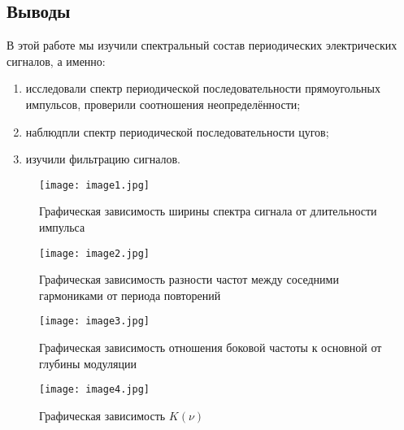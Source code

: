 \documentclass[a4paper,12pt]{article} %
\begin{document}
\subsection{Выводы}

В этой работе мы изучили спектральный состав периодических электрических сигналов, а именно:

\begin{enumerate}
    \item исследовали спектр периодической последовательности прямоугольных импульсов, проверили соотношения неопределённости;
    \item наблюдпли спектр периодической последовательности цугов;
    \item изучили фильтрацию сигналов.
\end{enumerate}


    \begin{figure}[h]
        \centering
        \texttt{[image: image1.jpg]}
        \caption{Графическая зависимость ширины спектра сигнала от длительности импульса}
        \label{graf1}
    \end{figure}
    \begin{figure}[h]
        \centering
        \texttt{[image: image2.jpg]}
        \caption{Графическая зависимость разности частот между соседними гармониками от периода повторений}
        \label{graf2}
    \end{figure}
    \begin{figure}[h]
        \centering
        \texttt{[image: image3.jpg]}
        \caption{Графическая зависимость отношения боковой частоты к основной от глубины модуляции}
        \label{graf3}
    \end{figure}
    \begin{figure}[h]
        \centering
        \texttt{[image: image4.jpg]}
        \caption{Графическая зависимость $K(\nu)$}
        \label{graf3}
    \end{figure}
\end{document}
